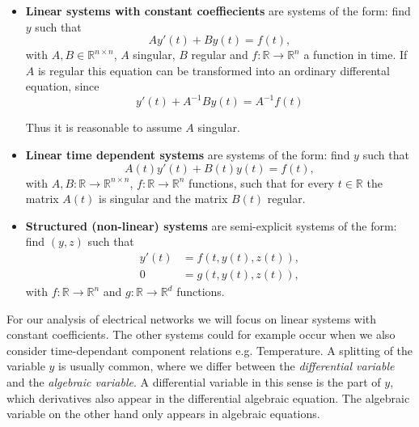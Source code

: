 	\begin{itemize}
		\item \textbf{Linear systems with constant coeffiecients} \newline
		are systems of the form: find $y$ such that
		\begin{equation}
			\label{DAE-const-coeff}
			A y'(t) + B y(t) = f(t) ,
		\end{equation}
		with $A,B \in \mathbb{R}^{n \times n}$, $A$ singular, $B$ regular and $f:\mathbb{R} \to \mathbb{R}^n$ a function in time. If $A$ is regular this equation can be transformed into an ordinary differental equation, since
		\begin{displaymath}
			y'(t) + A^{-1}By(t) = A^{-1} f(t)
		\end{displaymath}
		
		Thus it is reasonable to assume $A$ singular.
		
		\item \textbf{Linear time dependent systems}
		are systems of the form: find $y$ such that
		\begin{displaymath}
			A(t) y'(t) + B(t) y(t) = f(t) ,
		\end{displaymath}
		with $A, B:\mathbb{R} \to \mathbb{R}^{n \times n}$, $f:\mathbb{R} \to \mathbb{R}^n$ functions, such that for every $t \in \mathbb{R}$ the matrix $A(t)$ is singular and the matrix $B(t)$ regular.
		
		\item  \textbf{Structured (non-linear) systems} \newline
		are semi-explicit systems of the form: find $(y,z)$ such that
		\begin{align}
			y'(t) &= f(t, y(t), z(t)) , \\
			0 &= g(t,y(t),z(t)) ,
		\end{align}
		with $f:\mathbb{R} \to \mathbb{R}^n$ and $g:\mathbb{R} \to \mathbb{R}^d$ functions.
	\end{itemize}
	
	For our analysis of electrical networks we will focus on linear systems with constant coefficients. The other systems could for example occur when we also consider time-dependant component relations e.g. Temperature. 
	A splitting of the variable $y$ is usually common, where we differ between the \emph{differential variable} and the \emph{algebraic variable}. A differential variable in this sense is the part of $y$, which derivatives also appear in the differential algebraic equation. The algebraic variable on the other hand only appears in algebraic equations.

